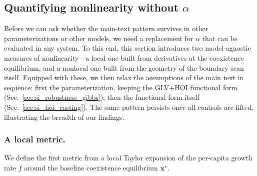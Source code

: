 \documentclass[pdflatex,sn-mathphys-num]{sn-jnl}%
\begin{document}
\subsection{Quantifying nonlinearity without \texorpdfstring{$\alpha$}{alpha}}
\label{sec:alpha_eff}
Before we can ask whether the main-text pattern survives in other parameterizations or other models, we need a replacement for $\alpha$ that can be evaluated in any system. To this end, this section introduces two model-agnostic measures of nonlinearity---a local one built from derivatives at the coexistence equilibrium, and a nonlocal one built from the geometry of the boundary scan itself. Equipped with these, we then relax the assumptions of the main text in sequence: first the parameterization, keeping the GLV+HOI functional form (Sec.~\ref{sec:si_robustness_gibbs}); then the functional form itself (Sec.~\ref{sec:si_hoi_casting}). The same pattern persists once all controls are lifted, illustrating the breadth of our findings.

\subsubsection{A local metric.}
\label{sec:alpha_taylor}

We define the first metric from a local Taylor expansion of the per-capita growth rate $f$ around the baseline coexistence equilibrium $\mathbf{x}^\star$.
\end{document}
